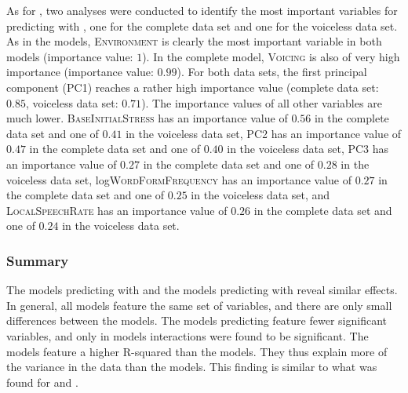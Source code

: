 As for , two  analyses were conducted to identify the most important variables for predicting  with , one for the complete data set and one for the voiceless data set. 
 As in the  models, \textsc{Environment} is clearly the most important variable in both models (importance value: $1$). In the complete model, \textsc{Voicing} is also of very high importance  (importance value: $0.99$). For both data sets, the first principal component (\textsc{PC1}) reaches a rather high importance value (complete data set: $0.85$,  voiceless data set: $0.71$). The importance values of all other variables are much lower.
\textsc{BaseInitialStress} has an importance value of $0.56$ in the complete data set and one of $0.41$ in the voiceless data set,   
\textsc{PC2} has an importance value of $0.47$ in the complete data set and one of $0.40$ in the voiceless data set,   
\textsc{PC3} has an importance value of $0.27$ in the complete data set and one of $0.28$ in the voiceless data set,   
log\textsc{WordFormFrequency} has an importance value of $0.27$ in the complete data set and one of $0.25$ in the voiceless data set, and  
\textsc{LocalSpeechRate} has an importance value of $0.26$ in the complete data set and one of $0.24$ in the voiceless data set.  

\subsubsection{Summary}
The models predicting  with  and the models predicting  with  reveal similar effects. In general, all models feature the same set of variables, and there are only small differences between the models. The models predicting  feature fewer significant variables, and only in  models interactions were found to be significant. 
The  models feature a higher R-squared than the  models. They thus explain more of the variance in the data than the  models. This finding is similar to what was found for  and . 

